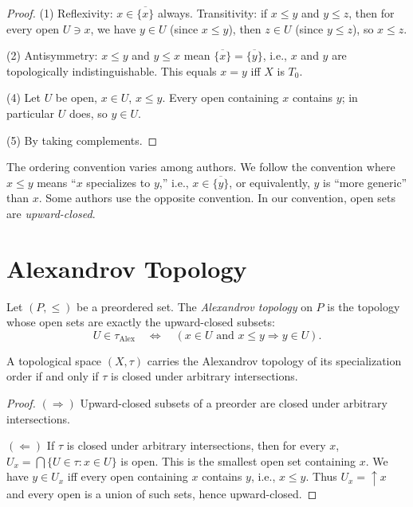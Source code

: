 \begin{proof}
(1) Reflexivity: $x \in \overline{\{x\}}$ always. Transitivity: if $x \leq y$ and
$y \leq z$, then for every open $U \ni x$, we have $y \in U$ (since $x \leq y$), then
$z \in U$ (since $y \leq z$), so $x \leq z$.

(2) Antisymmetry: $x \leq y$ and $y \leq x$ mean $\overline{\{x\}} = \overline{\{y\}}$,
i.e., $x$ and $y$ are topologically indistinguishable. This equals $x = y$ iff $X$ is
$T_0$.

(4) Let $U$ be open, $x \in U$, $x \leq y$. Every open containing $x$ contains $y$; in
particular $U$ does, so $y \in U$.

(5) By taking complements.
\end{proof}

\begin{warning}
The ordering convention varies among authors. We follow the convention where $x \leq y$
means ``$x$ specializes to $y$,'' i.e., $x \in \overline{\{y\}}$, or equivalently, $y$ is
``more generic'' than $x$. Some authors use the opposite convention. In our convention,
open sets are \emph{upward-closed}.
\end{warning}

\section{Alexandrov Topology}

\begin{definition}
Let $(P, \leq)$ be a preordered set. The \emph{Alexandrov topology} on $P$ is the topology
whose open sets are exactly the upward-closed subsets:
\[
  U \in \tau_{\mathrm{Alex}} \quad \Longleftrightarrow \quad
  (x \in U \text{ and } x \leq y \Rightarrow y \in U).
\]
\end{definition}

\begin{theorem}
A topological space $(X,\tau)$ carries the Alexandrov topology of its specialization order
if and only if $\tau$ is closed under arbitrary intersections.
\end{theorem}

\begin{proof}
$(\Rightarrow)$ Upward-closed subsets of a preorder are closed under arbitrary
intersections.

$(\Leftarrow)$ If $\tau$ is closed under arbitrary intersections, then for every $x$,
$U_x = \bigcap\{U \in \tau : x \in U\}$ is open. This is the smallest open set containing
$x$. We have $y \in U_x$ iff every open containing $x$ contains $y$, i.e., $x \leq y$.
Thus $U_x = \uparrow\! x$ and every open is a union of such sets, hence upward-closed.
\end{proof}

